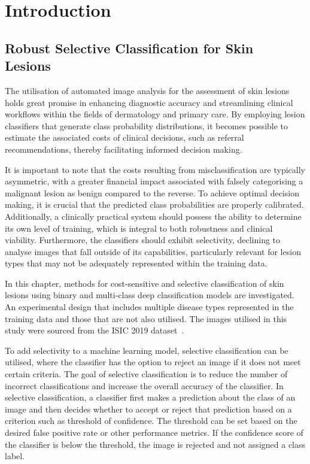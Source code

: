 \section{Introduction}
\label{sec:selective_introduction}
\subsection{Robust Selective Classification for Skin\\Lesions}
\label{subsec:robust and selective}
The utilisation of automated image analysis for the assessment of skin lesions holds great promise in enhancing diagnostic accuracy and streamlining clinical workflows within the fields of dermatology and primary care. By employing lesion classifiers that generate class probability distributions, it becomes possible to estimate the associated costs of clinical decisions, such as referral recommendations, thereby facilitating informed decision making.

It is important to note that the costs resulting from misclassification are typically asymmetric, with a greater financial impact associated with falsely categorising a malignant lesion as benign compared to the reverse. To achieve optimal decision making, it is crucial that the predicted class probabilities are properly calibrated. Additionally, a clinically practical system should possess the ability to determine its own level of training, which is integral to both robustness and clinical viability. Furthermore, the classifiers should exhibit selectivity, declining to analyse images that fall outside of its capabilities, particularly relevant for lesion types that may not be adequately represented within the training data.

In this chapter, methods for cost-sensitive and selective classification of skin lesions using binary and multi-class deep classification models are investigated. An experimental design that includes multiple disease types represented in the training data and those that are not also utilised. The images utilised in this study were sourced from the ISIC 2019 dataset~\citep{codella2018skin,combalia2019bcn20000,tschandl2018ham10000}.

To add selectivity to a machine learning model, selective classification can be utilised, where the classifier has the option to reject an image if it does not meet certain criteria. The goal of selective classification is to reduce the number of incorrect classifications and increase the overall accuracy of the classifier. In selective classification, a classifier first makes a prediction about the class of an image and then decides whether to accept or reject that prediction based on a criterion such as threshold of confidence. The threshold can be set based on the desired false positive rate or other performance metrics. If the confidence score of the classifier is below the threshold, the image is rejected and not assigned a class label.

